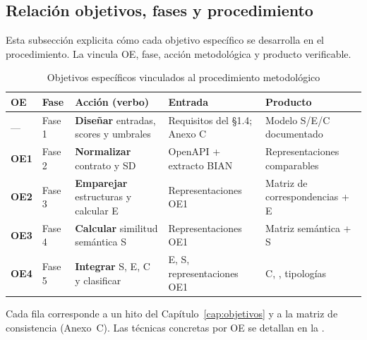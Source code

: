 \subsection{Relación objetivos, fases y procedimiento}
\label{sec:objetivos-metodologia}

Esta subsección explicita cómo cada objetivo específico se desarrolla en el procedimiento. La
 vincula OE, fase, acción metodológica y producto verificable.

\begin{table}[H]
  \centering
  \caption{Objetivos específicos vinculados al procedimiento metodológico}
  \label{tab:oe-metodologia}
  \small
  \begin{tabular}{@{}p{}p{}p{}p{}p{}@{}}
    \toprule
    \textbf{OE} & \textbf{Fase} & \textbf{Acción (verbo)} & \textbf{Entrada} & \textbf{Producto} \\
    \midrule
    --- &
    Fase 1 &
    \textbf{Diseñar} entradas, scores y umbrales &
    Requisitos del §1.4; Anexo C &
    Modelo S/E/C documentado \\
    \textbf{OE1} &
    Fase 2 &
    \textbf{Normalizar} contrato y SD &
    OpenAPI + extracto BIAN &
    Representaciones comparables \\
    \textbf{OE2} &
    Fase 3 &
    \textbf{Emparejar} estructuras y calcular E &
    Representaciones OE1 &
    Matriz de correspondencias + E \\
    \textbf{OE3} &
    Fase 4 &
    \textbf{Calcular} similitud semántica S &
    Representaciones OE1 &
    Matriz semántica + S \\
    \textbf{OE4} &
    Fase 5 &
    \textbf{Integrar} S, E, C y clasificar &
    E, S, representaciones OE1 &
    C, \AlignmentScore{}, tipologías \\
    \bottomrule
  \end{tabular}
\end{table}

Cada fila corresponde a un hito del Capítulo~\ref{cap:objetivos} y a la matriz de consistencia
(Anexo~C). Las técnicas concretas por OE se detallan en la .
